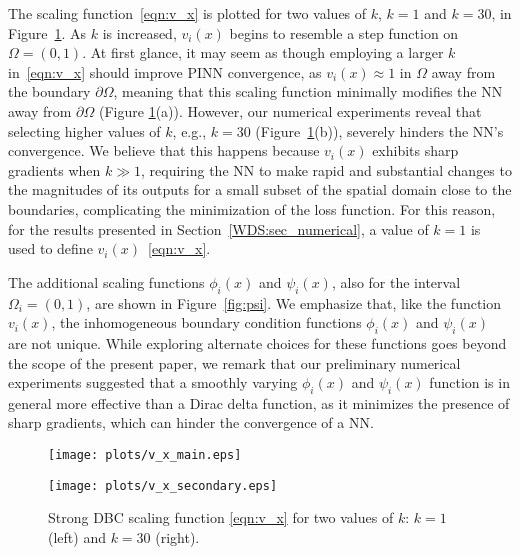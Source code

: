 \documentclass[oneside,final]{csri23}
\begin{document}
The scaling function~\eqref{eqn:v_x} is plotted for two values of $k$, $k=1$ and $k=30$, in Figure~\ref{fig:tanh}. As $k$ is increased, %
$v_i(x)$ begins to resemble a step function on $\Omega = (0,1)$.  
At first glance, it may seem as though employing a larger $k$ in~\eqref{eqn:v_x} should improve PINN convergence, as $v_i(x) \approx 1$ in $\Omega$ away from the boundary $\partial \Omega$, meaning that this scaling function minimally modifies the NN away from $\partial \Omega$ (Figure \ref{fig:tanh}(a)). However, our numerical experiments reveal that selecting higher values of $k$, e.g., $k=30$ (Figure~\ref{fig:tanh}(b)), severely hinders the NN's convergence. We believe that this happens because $v_i(x)$ exhibits sharp gradients when $k \gg 1$, requiring the NN to make rapid and substantial changes to the magnitudes of its outputs for a small subset of the spatial domain close to the boundaries, complicating the minimization of the loss function. For this reason, for the results presented in Section~\ref{WDS:sec_numerical}, a value of $k=1$ is used to define $v_i(x)$~\eqref{eqn:v_x}.   

The additional scaling functions $\phi_i(x)$ and $\psi_i(x)$, also for the interval $\Omega_i = (0,1)$, are shown in Figure~\ref{fig:psi}.  We emphasize that, like the function $v_i(x)$, the inhomogeneous boundary condition functions $\phi_i(x)$ and $\psi_i(x)$ are not unique.  While exploring alternate choices for these functions goes beyond the scope of the present paper, we remark that our preliminary numerical experiments suggested that a smoothly varying $\phi_i(x)$ and $\psi_i(x)$ function is in general more effective than a Dirac delta function, as it minimizes the presence of sharp gradients, which can hinder the convergence of a NN.


\begin{figure}
    \begin{minipage}{0.49\linewidth}
        \texttt{[image: plots/v\_x\_main.eps]}
    \end{minipage}
    \begin{minipage}{0.49\linewidth}
        \texttt{[image: plots/v\_x\_secondary.eps]}
    \end{minipage}
    \caption{Strong DBC scaling function \eqref{eqn:v_x} for two values of $k$: $k=1$ (left) and $k=30$ (right).}
    \label{fig:tanh}
\end{figure}
\end{document}
